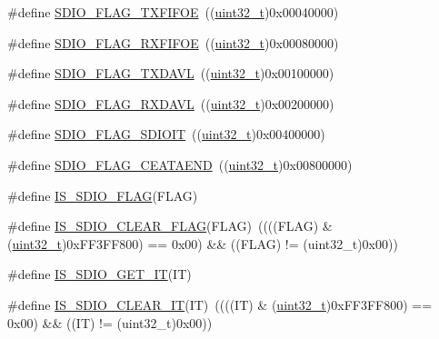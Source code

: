 \begin{DoxyCompactItemize}
\item 
\#define \hyperlink{group___s_d_i_o___flags_gac41ef05773abad79b4b0c443a77733db}{S\+D\+I\+O\+\_\+\+F\+L\+A\+G\+\_\+\+T\+X\+F\+I\+F\+OE}~((\hyperlink{_p_e___types_8h_a33594304e786b158f3fb30289278f5af}{uint32\+\_\+t})0x00040000)
\item 
\#define \hyperlink{group___s_d_i_o___flags_ga59ea7e2dc22df742053c5e525b98599d}{S\+D\+I\+O\+\_\+\+F\+L\+A\+G\+\_\+\+R\+X\+F\+I\+F\+OE}~((\hyperlink{_p_e___types_8h_a33594304e786b158f3fb30289278f5af}{uint32\+\_\+t})0x00080000)
\item 
\#define \hyperlink{group___s_d_i_o___flags_ga9c6620d6b16b6af19d3e14f40e688631}{S\+D\+I\+O\+\_\+\+F\+L\+A\+G\+\_\+\+T\+X\+D\+A\+VL}~((\hyperlink{_p_e___types_8h_a33594304e786b158f3fb30289278f5af}{uint32\+\_\+t})0x00100000)
\item 
\#define \hyperlink{group___s_d_i_o___flags_ga7558b354658171bb6aa1b6f1e16d8e21}{S\+D\+I\+O\+\_\+\+F\+L\+A\+G\+\_\+\+R\+X\+D\+A\+VL}~((\hyperlink{_p_e___types_8h_a33594304e786b158f3fb30289278f5af}{uint32\+\_\+t})0x00200000)
\item 
\#define \hyperlink{group___s_d_i_o___flags_gae888ec1c9885c35a5f8e01bcffe324a1}{S\+D\+I\+O\+\_\+\+F\+L\+A\+G\+\_\+\+S\+D\+I\+O\+IT}~((\hyperlink{_p_e___types_8h_a33594304e786b158f3fb30289278f5af}{uint32\+\_\+t})0x00400000)
\item 
\#define \hyperlink{group___s_d_i_o___flags_ga3c8d09a405944948e7a1c5493d49aff1}{S\+D\+I\+O\+\_\+\+F\+L\+A\+G\+\_\+\+C\+E\+A\+T\+A\+E\+ND}~((\hyperlink{_p_e___types_8h_a33594304e786b158f3fb30289278f5af}{uint32\+\_\+t})0x00800000)
\item 
\#define \hyperlink{group___s_d_i_o___flags_ga04b3c3c316e112172abacbf5e316f24a}{I\+S\+\_\+\+S\+D\+I\+O\+\_\+\+F\+L\+AG}(F\+L\+AG)
\item 
\#define \hyperlink{group___s_d_i_o___flags_ga8a093bc0b51901676fd5da7087d8ab3a}{I\+S\+\_\+\+S\+D\+I\+O\+\_\+\+C\+L\+E\+A\+R\+\_\+\+F\+L\+AG}(F\+L\+AG)~((((F\+L\+AG) \& (\hyperlink{_p_e___types_8h_a33594304e786b158f3fb30289278f5af}{uint32\+\_\+t})0x\+F\+F3\+F\+F800) == 0x00) \&\& ((\+F\+L\+A\+G) != (uint32\+\_\+t)0x00))
\item 
\#define \hyperlink{group___s_d_i_o___flags_gaef42c81f1f6250d8f9f438f4e16d1e98}{I\+S\+\_\+\+S\+D\+I\+O\+\_\+\+G\+E\+T\+\_\+\+IT}(IT)
\item 
\#define \hyperlink{group___s_d_i_o___flags_gaf829b01d8c3e9a1e4e04d39abdc8c355}{I\+S\+\_\+\+S\+D\+I\+O\+\_\+\+C\+L\+E\+A\+R\+\_\+\+IT}(IT)~((((IT) \& (\hyperlink{_p_e___types_8h_a33594304e786b158f3fb30289278f5af}{uint32\+\_\+t})0x\+F\+F3\+F\+F800) == 0x00) \&\& ((\+I\+T) != (uint32\+\_\+t)0x00))

\end{DoxyCompactItemize}
